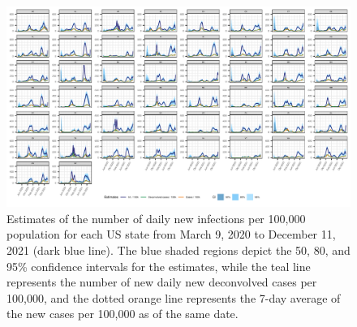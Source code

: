 \documentclass{article}
\begin{document}

\begin{landscape}
\thispagestyle{empty}
\begin{figure}[!tb]
    \centering
    \includegraphics[width=.99\linewidth]{state_niauc_before_dec11.pdf} 
    \caption{Estimates of the number of daily new infections per
     100,000 population for each US state from March 9, 2020 to December 11, 2021
      (dark blue line). The blue shaded regions depict the 50, 80, and 95\% confidence 
      intervals for the estimates, while the teal line represents the 
      number of new daily new deconvolved cases per 100,000, and the dotted 
      orange line represents the 7-day average of the new cases per 100,000 as 
      of the same date.}
    \label{fig:state_est_upto_dec1121}
\fillandplacepagenumber
\end{figure}
\end{landscape}
\end{document}

